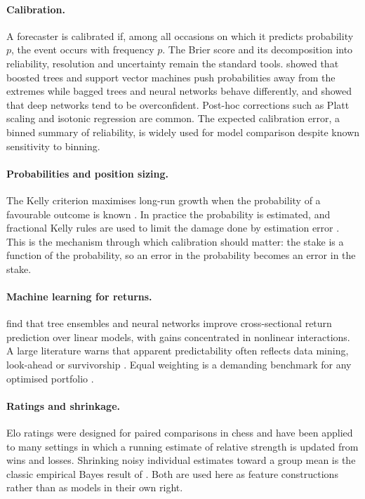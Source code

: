 \documentclass[11pt,a4paper]{article}
\begin{document}
\paragraph{Calibration.} A forecaster is calibrated if, among all occasions on which it predicts probability $p$, the event occurs with frequency $p$. The Brier score \citep{brier1950} and its decomposition into reliability, resolution and uncertainty \citep{murphy1973} remain the standard tools. \citet{niculescu2005} showed that boosted trees and support vector machines push probabilities away from the extremes while bagged trees and neural networks behave differently, and \citet{guo2017} showed that deep networks tend to be overconfident. Post-hoc corrections such as Platt scaling \citep{platt1999} and isotonic regression \citep{zadrozny2002} are common. The expected calibration error, a binned summary of reliability, is widely used for model comparison \citep{naeini2015} despite known sensitivity to binning.

\paragraph{Probabilities and position sizing.} The Kelly criterion maximises long-run growth when the probability of a favourable outcome is known \citep{kelly1956}. In practice the probability is estimated, and fractional Kelly rules are used to limit the damage done by estimation error \citep{thorp2006,maclean2011}. This is the mechanism through which calibration should matter: the stake is a function of the probability, so an error in the probability becomes an error in the stake.

\paragraph{Machine learning for returns.} \citet{gu2020} find that tree ensembles and neural networks improve cross-sectional return prediction over linear models, with gains concentrated in nonlinear interactions. A large literature warns that apparent predictability often reflects data mining, look-ahead or survivorship \citep{harvey2016,bailey2014,lopezdeprado2018}. Equal weighting is a demanding benchmark for any optimised portfolio \citep{demiguel2009}.

\paragraph{Ratings and shrinkage.} Elo ratings were designed for paired comparisons in chess \citep{elo1978} and have been applied to many settings in which a running estimate of relative strength is updated from wins and losses. Shrinking noisy individual estimates toward a group mean is the classic empirical Bayes result of \citet{efron1977}. Both are used here as feature constructions rather than as models in their own right.
\end{document}
